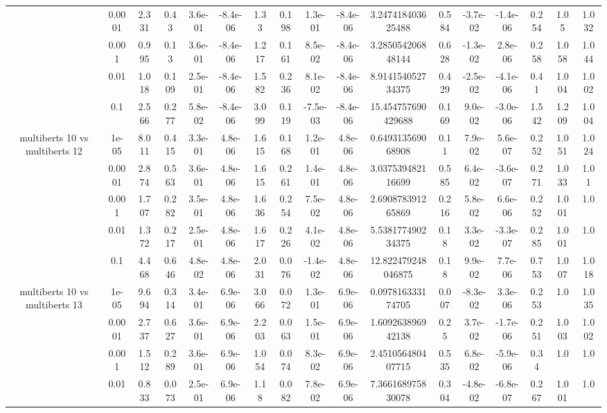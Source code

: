 \begin{tabular}{|c|c|c|c|c|c|c|c|c|c|c|c|c|c|c|c|c|}
 & 0.0001 & 2.331 & 0.43 & 3.6e-01 & -8.4e-06 & 1.33 & 0.198 & 1.3e-01 & -8.4e-06 & 3.247418403625488 & 0.584 & -3.7e-02 & -1.4e-06 & 0.254 & 1.05 & 1.032 \\
 & 0.001 & 0.995 & 0.13 & 3.6e-01 & -8.4e-06 & 1.217 & 0.161 & 8.5e-02 & -8.4e-06 & 3.285054206848144 & 0.628 & -1.3e-02 & 2.8e-06 & 0.258 & 1.058 & 1.044 \\
 & 0.01 & 1.018 & 0.109 & 2.5e-01 & -8.4e-06 & 1.582 & 0.236 & 8.1e-02 & -8.4e-06 & 8.914154052734375 & 0.429 & -2.5e-02 & -4.1e-06 & 0.41 & 1.004 & 1.002 \\
 & 0.1 & 2.566 & 0.277 & 5.8e-02 & -8.4e-06 & 3.099 & 0.119 & -7.5e-03 & -8.4e-06 & 15.454757690429688 & 0.169 & 9.0e-02 & -3.0e-06 & 1.542 & 1.209 & 1.004 \\
\hline
\multirow{5}{*}{multiberts 10 vs multiberts 12} & 1e-05 & 8.011 & 0.415 & 3.3e-01 & 4.8e-06 & 1.615 & 0.168 & 1.2e-01 & 4.8e-06 & 0.649313569068908 & 0.11 & 7.9e-02 & 5.6e-07 & 0.252 & 1.051 & 1.024 \\
 & 0.0001 & 2.874 & 0.563 & 3.6e-01 & 4.8e-06 & 1.615 & 0.261 & 1.4e-01 & 4.8e-06 & 3.037539482116699 & 0.585 & 6.4e-02 & -3.6e-07 & 0.271 & 1.033 & 1.01 \\
 & 0.001 & 1.707 & 0.282 & 3.5e-01 & 4.8e-06 & 1.636 & 0.254 & 7.5e-02 & 4.8e-06 & 2.690878391265869 & 0.216 & 5.8e-02 & 6.6e-06 & 0.252 & 1.001 & 1.0 \\
 & 0.01 & 1.372 & 0.217 & 2.5e-01 & 4.8e-06 & 1.617 & 0.226 & 4.1e-02 & 4.8e-06 & 5.538177490234375 & 0.18 & 3.3e-02 & -3.3e-07 & 0.285 & 1.001 & 1.0 \\
 & 0.1 & 4.468 & 0.646 & 4.8e-02 & 4.8e-06 & 2.031 & 0.076 & -1.4e-02 & 4.8e-06 & 12.822479248046875 & 0.18 & 9.9e-02 & 7.7e-06 & 0.753 & 1.007 & 1.018 \\
\hline
\multirow{5}{*}{multiberts 10 vs multiberts 13} & 1e-05 & 9.694 & 0.314 & 3.4e-01 & 6.9e-06 & 3.066 & 0.072 & 1.3e-01 & 6.9e-06 & 0.097816333174705 & 0.007 & -8.3e-02 & 3.3e-06 & 0.253 & 1.0 & 1.035 \\
 & 0.0001 & 2.737 & 0.627 & 3.6e-01 & 6.9e-06 & 2.203 & 0.063 & 1.5e-01 & 6.9e-06 & 1.609263896942138 & 0.25 & 3.7e-02 & -1.7e-06 & 0.251 & 1.003 & 1.002 \\
 & 0.001 & 1.512 & 0.289 & 3.6e-01 & 6.9e-06 & 1.054 & 0.074 & 8.3e-02 & 6.9e-06 & 2.451056480407715 & 0.535 & 6.8e-02 & -5.9e-06 & 0.34 & 1.0 & 1.0 \\
 & 0.01 & 0.833 & 0.073 & 2.5e-01 & 6.9e-06 & 1.18 & 0.082 & 7.8e-02 & 6.9e-06 & 7.366168975830078 & 0.304 & -4.8e-02 & -6.8e-07 & 0.267 & 1.001 & 1.0 \\

\end{tabular}

